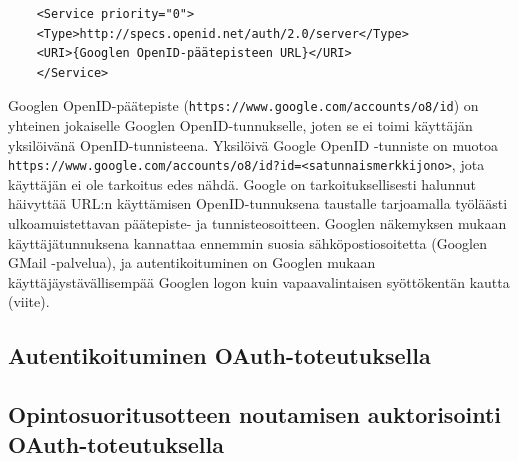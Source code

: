 \documentclass[finnish,gradu]{tktltiki}
\begin{document}
  \begin{verbatim}
    <Service priority="0">
    <Type>http://specs.openid.net/auth/2.0/server</Type>
    <URI>{Googlen OpenID-päätepisteen URL}</URI>
    </Service>
  \end{verbatim}

  Googlen OpenID-päätepiste (\verb#https://www.google.com/accounts/o8/id#) on yhteinen jokaiselle Googlen OpenID-tunnukselle, joten se ei toimi käyttäjän yksilöivänä OpenID-tunnisteena. Yksilöivä Google OpenID -tunniste on muotoa \verb#https://www.google.com/accounts/o8/id?id=<satunnaismerkkijono>#, jota käyttäjän ei ole tarkoitus edes nähdä. Google on tarkoituksellisesti halunnut häivyttää URL:n käyttämisen OpenID-tunnuksena taustalle tarjoamalla työläästi ulkoamuistettavan päätepiste- ja tunnisteosoitteen. Googlen näkemyksen mukaan käyttäjätunnuksena kannattaa ennemmin suosia sähköpostiosoitetta (Googlen GMail -palvelua), ja autentikoituminen on Googlen mukaan käyttäjäystävällisempää Googlen logon kuin vapaavalintaisen syöttökentän kautta (viite).





  \subsection{Autentikoituminen OAuth-toteutuksella} %
  \label{sub:autentikoituminen_oauth}


  \subsection{Opintosuoritusotteen noutamisen auktorisointi OAuth-toteutuksella} %
  \label{sub:opintosuoritusotteen_noutamisen_auktorisointi_oauth_toteutuksella}
\end{document}
